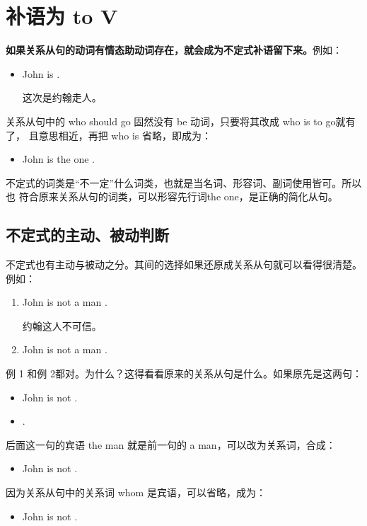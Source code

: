 \section{补语为 to V}

\textbf{如果关系从句的动词有情态助动词存在，就会成为不定式补语留下来。}例如：
\begin{itemize}
\item John is  .

  这次是约翰走人。
\end{itemize}
关系从句中的 who should go 固然没有 be 动词，只要将其改成 who is to go就有了，
且意思相近，再把 who is 省略，即成为：
\begin{itemize}
\item   John is the one .
\end{itemize}

不定式的词类是“不一定”什么词类，也就是当名词、形容词、副词使用皆可。所以也
符合原来关系从句的词类，可以形容先行词the one，是正确的简化从句。

\subsection{不定式的主动、被动判断}

不定式也有主动与被动之分。其间的选择如果还原成关系从句就可以看得很清楚。例如：
\begin{enumerate}
\item John is not a man .

  约翰这人不可信。
\item John is not a man  .
\end{enumerate}
例 1 和例 2都对。为什么？这得看看原来的关系从句是什么。如果原先是这两句：
\begin{itemize}
\item John is not .
\item {}  .
\end{itemize}
后面这一句的宾语 the man 就是前一句的 a man，可以改为关系词，合成：
\begin{itemize}
\item John is not  .
\end{itemize}

因为关系从句中的关系词 whom 是宾语，可以省略，成为：
\begin{itemize}
\item John is not  .
\end{itemize}

